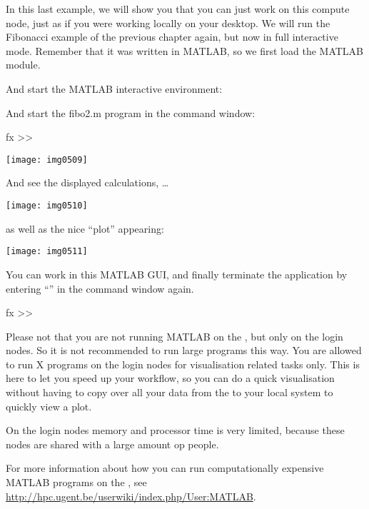 In this last example, we will show you that you can just work on this compute
node, just as if you were working locally on your desktop.  We will run the
Fibonacci example of the previous chapter again, but now in full interactive
mode. Remember that it was written in MATLAB, so we first load the MATLAB
module.

\begin{prompt}
\end{prompt}

And start the MATLAB interactive environment:

\begin{prompt}
\end{prompt}

And start the fibo2.m program in the command window:
\begin{prompt}
fx >> %
\end{prompt}

\texttt{[image: img0509]}

And see the displayed calculations, \dots

\texttt{[image: img0510]}

as well as the nice ``plot'' appearing:

\texttt{[image: img0511]}

You can work in this MATLAB GUI, and finally terminate the application by
entering ``'' in the command window again.

\begin{prompt}
fx >> %
\end{prompt}


Please not that you are not running MATLAB on the \hpc, but only on the
login nodes. So it is not recommended to run large programs this way.
You are allowed to run X programs on the login nodes for visualisation
related tasks only. This is here to let you speed up your workflow,
so you can do a quick visualisation without having to copy over all your data
from the \hpc to your local system to quickly view a plot.

On the login nodes memory and processor time is very limited, because these
nodes are shared with a large amount op people.

\ifgent
For more information about how you can run computationally expensive
MATLAB programs on the \hpc, see \url{http://hpc.ugent.be/userwiki/index.php/User:MATLAB}.
\fi

